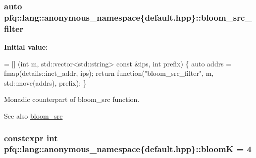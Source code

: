 \subsubsection[{\texorpdfstring{bloom\+\_\+src\+\_\+filter}{bloom_src_filter}}]{\setlength{\rightskip}{0pt plus 5cm}auto pfq\+::lang\+::anonymous\+\_\+namespace\{default.\+hpp\}\+::bloom\+\_\+src\+\_\+filter}\hypertarget{namespacepfq_1_1lang_1_1anonymous__namespace_02default_8hpp_03_a04d4dfefacab3230f7d17f0f797cd37e}{}\label{namespacepfq_1_1lang_1_1anonymous__namespace_02default_8hpp_03_a04d4dfefacab3230f7d17f0f797cd37e}
{\bfseries Initial value\+:}
\begin{DoxyCode}
= [] (\textcolor{keywordtype}{int} m, std::vector<std::string> \textcolor{keyword}{const} &ips, \textcolor{keywordtype}{int} prefix) \{
                                    \textcolor{keyword}{auto} addrs = fmap(details::inet\_addr, ips);
                                    \textcolor{keywordflow}{return} \textcolor{keyword}{function}(\textcolor{stringliteral}{"bloom\_src\_filter"}, m, std::move(addrs), prefix);
                                \}
\end{DoxyCode}


Monadic counterpart of {\ttfamily bloom\+\_\+src} function. 

\begin{DoxySeeAlso}{See also}
\hyperlink{namespacepfq_1_1lang_1_1anonymous__namespace_02default_8hpp_03_aa2a8ff506d61e93d8eca4419513970f4}{bloom\+\_\+src} 
\end{DoxySeeAlso}
\subsubsection[{\texorpdfstring{bloomK}{bloomK}}]{\setlength{\rightskip}{0pt plus 5cm}constexpr int pfq\+::lang\+::anonymous\+\_\+namespace\{default.\+hpp\}\+::bloomK = 4}\hypertarget{namespacepfq_1_1lang_1_1anonymous__namespace_02default_8hpp_03_a56750cdea1537acfa24c256b64924004}{}\label{namespacepfq_1_1lang_1_1anonymous__namespace_02default_8hpp_03_a56750cdea1537acfa24c256b64924004}

